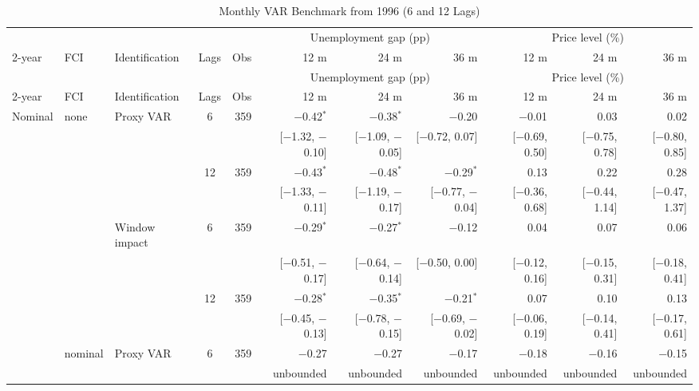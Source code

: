 \begingroup\scriptsize\setlength{\tabcolsep}{0.9pt}
\begin{longtable}{lllcrrrrrrr}
\caption{Monthly VAR Benchmark from 1996 (6 and 12 Lags)}\label{tab:appmonthly}\\
\toprule
 & & & & & \multicolumn{3}{c}{Unemployment gap (pp)} & \multicolumn{3}{c}{Price level (\%)}\\ \cmidrule(lr){6-8}\cmidrule(lr){9-11}
2-year & FCI & Identification & Lags & Obs & 12 m & 24 m & 36 m & 12 m & 24 m & 36 m\\
\midrule\endfirsthead
\toprule
 & & & & & \multicolumn{3}{c}{Unemployment gap (pp)} & \multicolumn{3}{c}{Price level (\%)}\\ \cmidrule(lr){6-8}\cmidrule(lr){9-11}
2-year & FCI & Identification & Lags & Obs & 12 m & 24 m & 36 m & 12 m & 24 m & 36 m\\
\midrule\endhead
\bottomrule\endfoot
Nominal & none & Proxy VAR & 6 & 359 & $-$0.42$^{*}$ & $-$0.38$^{*}$ & $-$0.20 & $-$0.01 & 0.03 & 0.02\\
 & & & & & {\tiny [$-$1.32, $-$0.10]} & {\tiny [$-$1.09, $-$0.05]} & {\tiny [$-$0.72, 0.07]} & {\tiny [$-$0.69, 0.50]} & {\tiny [$-$0.75, 0.78]} & {\tiny [$-$0.80, 0.85]}\\
 &  &  & 12 & 359 & $-$0.43$^{*}$ & $-$0.48$^{*}$ & $-$0.29$^{*}$ & 0.13 & 0.22 & 0.28\\
 & & & & & {\tiny [$-$1.33, $-$0.11]} & {\tiny [$-$1.19, $-$0.17]} & {\tiny [$-$0.77, $-$0.04]} & {\tiny [$-$0.36, 0.68]} & {\tiny [$-$0.44, 1.14]} & {\tiny [$-$0.47, 1.37]}\\
 &  & Window impact & 6 & 359 & $-$0.29$^{*}$ & $-$0.27$^{*}$ & $-$0.12 & 0.04 & 0.07 & 0.06\\
 & & & & & {\tiny [$-$0.51, $-$0.17]} & {\tiny [$-$0.64, $-$0.14]} & {\tiny [$-$0.50, 0.00]} & {\tiny [$-$0.12, 0.16]} & {\tiny [$-$0.15, 0.31]} & {\tiny [$-$0.18, 0.41]}\\
 &  &  & 12 & 359 & $-$0.28$^{*}$ & $-$0.35$^{*}$ & $-$0.21$^{*}$ & 0.07 & 0.10 & 0.13\\
 & & & & & {\tiny [$-$0.45, $-$0.13]} & {\tiny [$-$0.78, $-$0.15]} & {\tiny [$-$0.69, $-$0.02]} & {\tiny [$-$0.06, 0.19]} & {\tiny [$-$0.14, 0.41]} & {\tiny [$-$0.17, 0.61]}\\
 & nominal & Proxy VAR & 6 & 359 & $-$0.27 & $-$0.27 & $-$0.17 & $-$0.18 & $-$0.16 & $-$0.15\\
 & & & & & {\tiny unbounded} & {\tiny unbounded} & {\tiny unbounded} & {\tiny unbounded} & {\tiny unbounded} & {\tiny unbounded}\\

\end{longtable}
